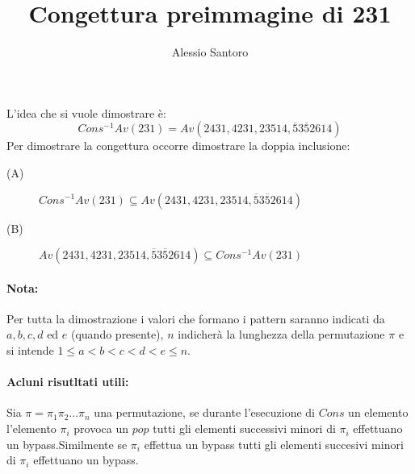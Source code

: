 \documentclass[10pt,a4paper]{article}
\author{Alessio Santoro}
\title{Congettura preimmagine di 231}
\date{}
\begin{document}
\maketitle
L'idea che si vuole dimostrare è:
$$Cons^{-1}Av(231) = Av(2431, 4231, 23514, \overline{5}3\overline{5}2614)$$
Per dimostrare la congettura occorre dimostrare la doppia inclusione:
\begin{description}
\item[(A)]$Cons^{-1}Av(231) \subseteq Av(2431, 4231, 23514, \overline{5}3\overline{5}2614)$
\item[(B)]$Av(2431, 4231, 23514, \overline{5}3\overline{5}2614) \subseteq Cons^{-1}Av(231)$
\end{description}
\paragraph*{Nota:}Per tutta la dimostrazione i valori che formano i pattern saranno indicati da $a,b,c,d$ ed $e$ (quando presente), $n$ indicherà la lunghezza della permutazione $\pi$ e si intende $1\leq{a}<b<c<d<e\leq{n}$.
\paragraph*{Acluni risutltati utili:} Sia $\pi=\pi_1\pi_2\dots\pi_n$ una permutazione, se durante l'esecuzione di $Cons$ un elemento l'elemento $\pi_i$ provoca un $pop$ tutti gli elementi successivi minori di $\pi_i$ effettuano un bypass.Similmente se $\pi_i$ effettua un bypass tutti gli elementi succesivi minori di $\pi_i$ effettuano un bypass.
\end{document}
